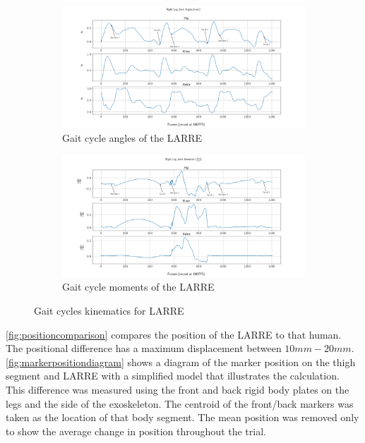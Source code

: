 \begin{figure}
    \begin{subfigure}{\textwidth}
        \centering
        \captionsetup{justification=centering}
        \centerline{
        \includegraphics[width=\textwidth, frame]{images/mech_design/exo_joint_angles.png}}
        \caption[LARRE gait cycle angles]{Gait cycle angles of the LARRE}
        \label{fig:larregaitangles}
    \end{subfigure}
    \begin{subfigure}{\textwidth}
        \centering
        \captionsetup{justification=centering}
        \centerline{
        \includegraphics[width=\textwidth, frame]{images/mech_design/exo_joint_moments.png}}
        \caption[LARRE gait cycle moments]{Gait cycle moments of the LARRE}
        \label{fig:larregaitmoments}
    \end{subfigure}
    \caption{Gait cycles kinematics for LARRE}
    \label{fig:exojointkin}
\end{figure}




\autoref{fig:positioncomparison} compares the position of the LARRE to that human. The positional difference has a maximum displacement between $10mm-20mm$. \autoref{fig:markerpositiondiagram} shows a diagram of the marker position on the thigh segment and LARRE with a simplified model that illustrates the calculation. This difference was measured using the front and back rigid body plates on the legs and the side of the exoskeleton. The centroid of the front/back markers was taken as the location of that body segment. The mean position was removed only to show the average change in position throughout the trial.  

